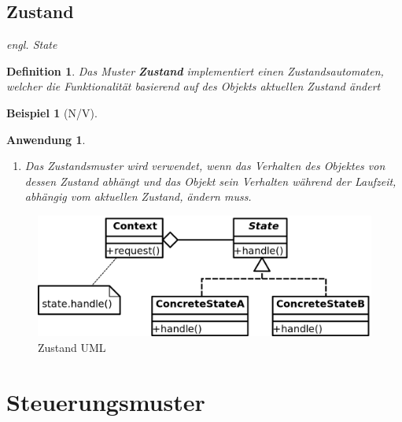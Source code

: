 \documentclass[a4paper]{article}
\theoremstyle{break}
\newtheorem{defi}{Definition}[section]
\newtheorem{ex}{Beispiel}[section]
\newtheorem{why}{Anwendung}[section]
\begin{document}
\subsection{Zustand}
\textit{engl. State}
\begin{defi}
	Das Muster \textbf{Zustand} implementiert einen Zustandsautomaten, welcher die Funktionalität basierend auf des Objekts aktuellen Zustand ändert
\end{defi}
\begin{ex}[N/V]
\end{ex}
\begin{why}
	\begin{enumerate}
		\item Das Zustandsmuster wird verwendet, wenn das Verhalten	des Objektes von dessen Zustand abhängt und das Objekt sein Verhalten während der Laufzeit, abhängig vom aktuellen Zustand, ändern muss.
	\end{enumerate}
\end{why}
\begin{figure}[H]
	\centering
	\includegraphics[width=\textwidth]{../diagrams/uml/StatePattern.png}
	\caption{Zustand UML}
\end{figure}

\newpage
\section{Steuerungsmuster}
\end{document}
